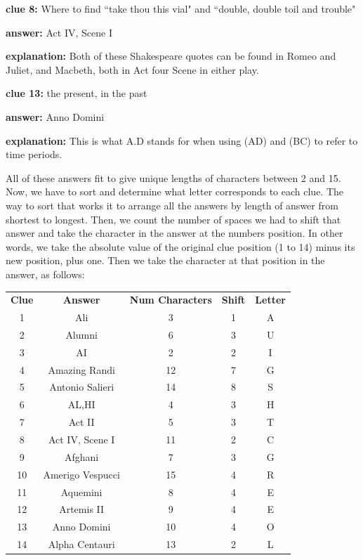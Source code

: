 \documentclass{article}
\begin{document}
\quad

\textbf{clue 8: } Where to find ``take thou this vial" and ``double, double toil and trouble"

\quad\textbf{answer:} Act IV, Scene I

\quad\textbf{explanation:} Both of these Shakespeare quotes can be found in Romeo and Juliet, and Macbeth, both in Act four Scene in either play. 

\quad

\textbf{clue 13: } the present, in the past

\quad\textbf{answer:} Anno Domini 

\quad\textbf{explanation:} This is what A.D stands for when using (AD) and (BC) to refer to time periods.

\quad

All of these answers fit to give unique lengths of characters between 2 and 15. Now, we have to sort and determine what letter corresponds to each clue. The way to sort that works it to arrange all the answers by length of answer from shortest to longest. Then, we count the number of spaces we had to shift that answer and take the character in the answer at the numbers position. In other words, we take the absolute value of the original clue position (1 to 14) minus its new position, plus one. Then we take the character at that position in the answer, as follows:

\begin{tabular}{ c c c c c }
 \textbf{Clue} & \textbf{Answer} & \textbf{Num Characters} & \textbf{Shift} & \textbf{Letter} \\ 
 1 & Ali &  3 &  1 &  A\\  
 2 & Alumni &  6 &  3 &  U\\
 3 & AI &  2 & 2 &  I\\
 4 & Amazing Randi &  12 &  7 &  G\\
 5 & Antonio Salieri &  14 &  8 &  S\\
 6 & AL,HI &  4 &  3 &  H\\
 7 & Act II &  5 &  3 &  T\\
 8 & Act IV, Scene I &  11 &  2 &  C\\
 9 & Afghani &  7 &  3 &  G\\
 10 & Amerigo Vespucci &  15 &  4 &  R\\
 11 & Aquemini &  8 &  4 &  E\\
 12 & Artemis II &  9 &  4 &  E\\
 13 & Anno Domini  &  10 &  4 &  O\\
 14 & Alpha Centauri & 13 &  2 &  L  
\end{tabular}
\end{document}
